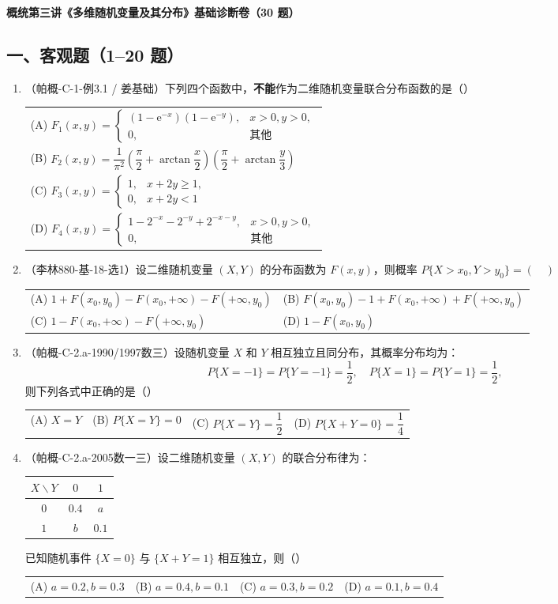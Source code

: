 \documentclass[12pt,a4paper]{ctexart}
\makeatletter
\newcommand{\optfour}[4]{\par\begin{tabularx}{\linewidth}{@{}X@{\quad}X@{\quad}X@{\quad}X@{}}#1&#2&#3&#4\end{tabularx}}
\newcommand{\opttwo}[4]{\par\begin{tabularx}{\linewidth}{@{}X@{\quad}X@{}}#1&#2\\[0.8em]#3&#4\end{tabularx}}
\newcommand{\optone}[4]{\par\begin{tabularx}{\linewidth}{@{}X@{}}#1\\[0.8em]#2\\[0.8em]#3\\[0.8em]#4\end{tabularx}}
\makeatother
\begin{document}
\begin{center}
{\Large\bfseries 概统第三讲《多维随机变量及其分布》基础诊断卷（30 题）}
\end{center}

\subsection*{一、客观题（1--20 题）}

\begin{enumerate}[label=\arabic*.]

\item（帕概-C-1-例3.1 / 姜基础）下列四个函数中，\textbf{不能}作为二维随机变量联合分布函数的是（\quad）
\optone{(A) $F_{1}(x,y) = \begin{cases} (1 - \mathrm{e}^{-x})(1 - \mathrm{e}^{-y}), & x > 0, y > 0, \\ 0, & \text{其他} \end{cases}$}%
{(B) $F_{2}(x,y) = \dfrac{1}{\pi^{2}}\left(\dfrac{\pi}{2} + \arctan\dfrac{x}{2}\right)\left(\dfrac{\pi}{2} + \arctan\dfrac{y}{3}\right)$}%
{(C) $F_{3}(x,y) = \begin{cases} 1, & x + 2y \geqslant 1, \\ 0, & x + 2y < 1 \end{cases}$}%
{(D) $F_{4}(x,y) = \begin{cases} 1 - 2^{-x} - 2^{-y} + 2^{-x-y}, & x > 0, y > 0, \\ 0, & \text{其他} \end{cases}$}

\item（李林880-基-18-选1）设二维随机变量 $(X, Y)$ 的分布函数为 $F(x, y)$，则概率 $P\{X > x_{0}, Y > y_{0}\} = (\quad)$
\opttwo{(A) $1 + F(x_{0}, y_{0}) - F(x_{0}, +\infty) - F(+\infty, y_{0})$}{(B) $F(x_{0}, y_{0}) - 1 + F(x_{0}, +\infty) + F(+\infty, y_{0})$}{(C) $1 - F(x_{0}, +\infty) - F(+\infty, y_{0})$}{(D) $1 - F(x_{0}, y_{0})$}

\item（帕概-C-2.a-1990/1997数三）设随机变量 $X$ 和 $Y$ 相互独立且同分布，其概率分布均为：
\[
P\{X = -1\} = P\{Y = -1\} = \frac{1}{2}, \quad P\{X = 1\} = P\{Y = 1\} = \frac{1}{2},
\]
则下列各式中正确的是（\quad）
\optfour{(A) $X = Y$}{(B) $P\{X = Y\} = 0$}{(C) $P\{X = Y\} = \dfrac{1}{2}$}{(D) $P\{X + Y = 0\} = \dfrac{1}{4}$}

\item（帕概-C-2.a-2005数一三）设二维随机变量 $(X, Y)$ 的联合分布律为：
\begin{center}
\begin{tabular}{|c|c|c|}
\hline
$X \backslash Y$ & $0$ & $1$ \\ \hline
$0$ & $0.4$ & $a$ \\ \hline
$1$ & $b$ & $0.1$ \\ \hline
\end{tabular}
\end{center}
已知随机事件 $\{X = 0\}$ 与 $\{X + Y = 1\}$ 相互独立，则（\quad）
\optfour{(A) $a = 0.2, b = 0.3$}{(B) $a = 0.4, b = 0.1$}{(C) $a = 0.3, b = 0.2$}{(D) $a = 0.1, b = 0.4$}


\end{enumerate}
\end{document}
